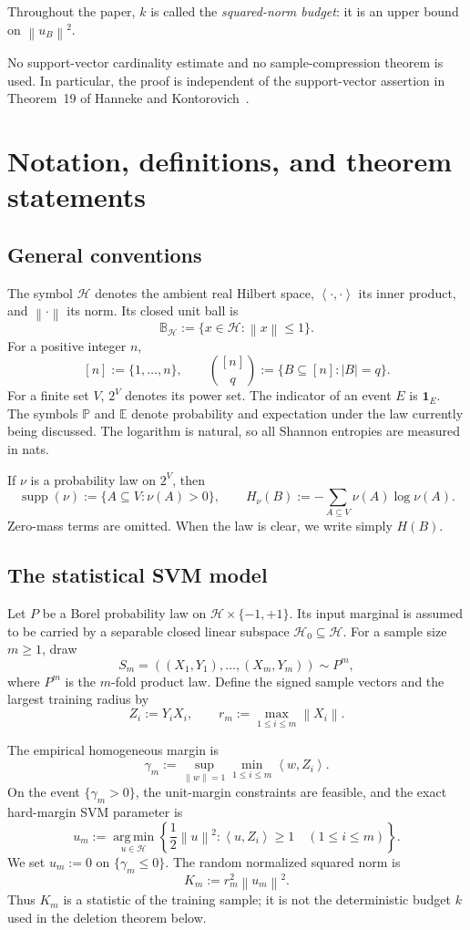 \documentclass[11pt]{article}
\theoremstyle{definition}
\theoremstyle{remark}
\newcommand{\Hh}{\mathcal H}
\newcommand{\E}{\mathbb E}
\newcommand{\Pp}{\mathbb P}
\newcommand{\one}{\mathbf 1}
\newcommand{\ip}[2]{\left\langle #1,#2\right\rangle}
\newcommand{\norm}[1]{\left\lVert #1\right\rVert}
\newcommand{\argminop}{\operatorname*{arg\,min}}
\newcommand{\supp}{\operatorname{supp}}
\begin{document}
Throughout the paper, \(k\) is called the \emph{squared-norm budget}: it is
an upper bound on \(\norm{u_B}^2\).

No support-vector cardinality estimate and no sample-compression theorem is
used. In particular, the proof is independent of the support-vector
assertion in Theorem~19 of Hanneke and Kontorovich~\cite{HK21}.

\section{Notation, definitions, and theorem statements}
\label{sec:definitions}

\subsection{General conventions}

The symbol \(\Hh\) denotes the ambient real Hilbert space,
\(\ip{\cdot}{\cdot}\) its inner product, and \(\norm{\cdot}\) its norm. Its
closed unit ball is
\[
 \mathbb B_{\Hh}:=\{x\in\Hh:\norm x\le1\}.
\]
For a positive integer \(n\),
\[
 [n]:=\{1,\ldots,n\},
 \qquad
 \binom{[n]}q:=\{B\subseteq[n]:|B|=q\}.
\]
For a finite set \(V\), \(2^V\) denotes its power set. The indicator of an
event \(E\) is \(\one_E\). The symbols \(\Pp\) and \(\E\) denote probability
and expectation under the law currently being discussed. The logarithm is
natural, so all Shannon entropies are measured in nats.

If \(\nu\) is a probability law on \(2^V\), then
\[
 \supp(\nu):=\{A\subseteq V:\nu(A)>0\},
 \qquad
 H_\nu(B):=-\sum_{A\subseteq V}\nu(A)\log\nu(A).
\]
Zero-mass terms are omitted. When the law is clear, we write simply \(H(B)\).

\subsection{The statistical SVM model}

Let \(P\) be a Borel probability law on
\(\Hh\times\{-1,+1\}\). Its input marginal is assumed to be carried by a
separable closed linear subspace \(\Hh_0\subseteq\Hh\). For a sample size
\(m\ge1\), draw
\[
 S_m=((X_1,Y_1),\ldots,(X_m,Y_m))\sim P^m,
\]
where \(P^m\) is the \(m\)-fold product law. Define the signed sample vectors
and the largest training radius by
\[
 Z_i:=Y_iX_i,
 \qquad
 r_m:=\max_{1\le i\le m}\norm{X_i}.
\]

The empirical homogeneous margin is
\[
 \gamma_m
 :=
 \sup_{\norm w=1}\min_{1\le i\le m}\ip{w}{Z_i}.
\]
On the event \(\{\gamma_m>0\}\), the unit-margin constraints are feasible,
and the exact hard-margin SVM parameter is
\[
 u_m
 :=
 \argminop_{u\in\Hh}
 \left\{
   \frac12\norm u^2:
   \ip{u}{Z_i}\ge1\quad(1\le i\le m)
 \right\}.
\]
We set \(u_m:=0\) on \(\{\gamma_m\le0\}\). The random normalized squared norm
is
\[
 K_m:=r_m^2\norm{u_m}^2.
\]
Thus \(K_m\) is a statistic of the training sample; it is not the
deterministic budget \(k\) used in the deletion theorem below.
\end{document}
